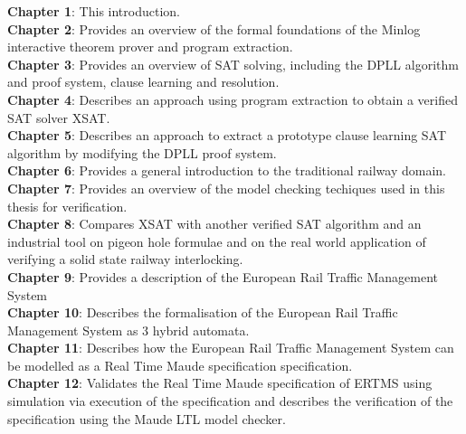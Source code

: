 \textbf{Chapter 1}: This introduction. 
\medskip \\
\textbf{Chapter 2}: Provides an overview of the formal foundations of the Minlog interactive theorem prover and program extraction. 
\medskip \\
\textbf{Chapter 3}: Provides an overview of SAT solving, including the DPLL algorithm and  proof system, clause learning and resolution. 
\medskip \\
\textbf{Chapter 4}: Describes an approach using program extraction to obtain a verified SAT solver XSAT.
\medskip  \\
\textbf{Chapter 5}: Describes an approach to extract a prototype clause learning SAT algorithm by modifying the DPLL proof system.
\medskip \\
\textbf{Chapter 6}: Provides a general introduction to the traditional railway domain.
\medskip \\
\textbf{Chapter 7}: Provides an overview of the model checking techiques used in this thesis for verification. \medskip \\
\textbf{Chapter 8}: Compares XSAT with another verified SAT algorithm and an industrial tool on pigeon hole formulae and on the real world application of verifying a solid state railway interlocking.
\medskip \\
\textbf{Chapter 9}: Provides a description of the European Rail Traffic Management System
\medskip \\
\textbf{Chapter 10}: Describes the formalisation of the European Rail Traffic Management System as 3 hybrid automata. 
\medskip \\
\textbf{Chapter 11}: Describes how the European Rail Traffic Management System can be modelled as a Real Time Maude specification  specification. 
\medskip \\
\textbf{Chapter 12}: Validates the Real Time Maude specification of ERTMS using simulation via execution of the specification and describes the verification of the specification using the Maude LTL model checker.


\medskip

